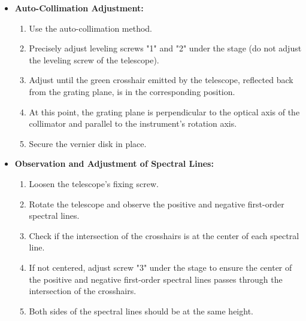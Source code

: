 \documentclass[UTF8]{article}
\begin{document}
\begin{itemize}
      \item \textbf{Auto-Collimation Adjustment:}
        \begin{enumerate}
          \item Use the auto-collimation method.
          \item Precisely adjust leveling screws "1" and "2" under the stage (do not adjust the leveling screw of the telescope).
          \item Adjust until the green crosshair emitted by the telescope, reflected back from the grating plane, is in the corresponding position.
          \item At this point, the grating plane is perpendicular to the optical axis of the collimator and parallel to the instrument's rotation axis.
          \item Secure the vernier disk in place.
        \end{enumerate}
        
      \item \textbf{Observation and Adjustment of Spectral Lines:}
        \begin{enumerate}
          \item Loosen the telescope's fixing screw.
          \item Rotate the telescope and observe the positive and negative first-order spectral lines.
          \item Check if the intersection of the crosshairs is at the center of each spectral line.
          \item If not centered, adjust screw "3" under the stage to ensure the center of the positive and negative first-order spectral lines passes through the intersection of the crosshairs.
          \item Both sides of the spectral lines should be at the same height.
        \end{enumerate}
    \end{itemize}
    
\end{document}
